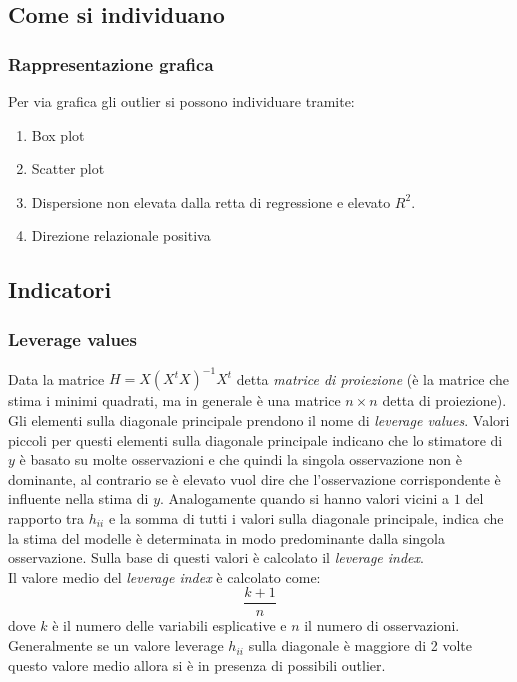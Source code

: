 \subsection{Come si individuano}
\subsubsection{Rappresentazione grafica}
Per via grafica gli outlier si possono individuare tramite:
\begin{enumerate}
	\item Box plot
	\item Scatter plot
	\item Dispersione non elevata dalla retta di regressione e elevato $R^2$.
	\item Direzione relazionale positiva
\end{enumerate}

\subsection{Indicatori}

\subsubsection{Leverage values}
Data la matrice $H = X(X^t X)^{-1} X^t$ detta \textit{matrice di proiezione} (è la matrice che stima i minimi quadrati, ma in generale è una matrice $n \times n$ detta di proiezione). Gli elementi sulla diagonale principale prendono il nome di \textit{leverage values}. Valori piccoli per questi elementi sulla diagonale principale indicano che lo stimatore di $y$ è basato su molte osservazioni e che quindi la singola osservazione non è dominante, al contrario se è elevato vuol dire che l'osservazione corrispondente è influente nella stima di $y$. Analogamente quando si hanno valori vicini a $1$ del rapporto tra $h_{ii}$ e la somma di tutti i valori sulla diagonale principale, indica che la stima del modelle è determinata in modo predominante dalla singola osservazione. Sulla base di questi valori è calcolato il \textit{leverage index}.\\
Il valore medio del \textit{leverage index} è calcolato come:
\begin{equation}
\frac{k+1}{n}
\end{equation}
dove $k$ è il numero delle variabili esplicative e $n$ il numero di osservazioni. Generalmente se un valore leverage $h_{ii}$ sulla diagonale è maggiore di 2 volte questo valore medio allora si è in presenza di possibili outlier.


